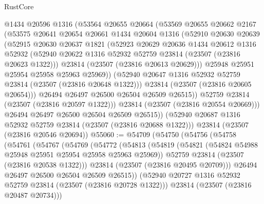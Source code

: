 \begin{lexlean}{RustCore}
\begin{coremodule}
            @1434
            @20596
            @1316
            (@53564
              @20655
              @20664
              (@53569
                @20655
                @20662
                @2167
                (@53575
                  @20641
                  @20654
                  @20661
                  @1434
                  @20604
                  @1316
                  (@52910
                    @20630
                    @20639
                    (@52915
                      @20630
                      @20637
                      @1821
                      (@52923
                        @20629
                        @20636
                        @1434
                        @20612
                        @1316
                        @52932
                        (@52940 @20622 @1316 @52932 @52759 @23814 (@23507 (@23816 @20623 @1322)))
                        @23814
                        (@23507 (@23816 @20613 @20629)))
                      @25948
                      @25951
                      @25954
                      @25958
                      @25963
                      @25969))
                  (@52940 @20647 @1316 @52932 @52759 @23814 (@23507 (@23816 @20648 @1322)))
                  @23814
                  (@23507 (@23816 @20605 @20654)))
                @26494
                @26497
                @26500
                @26504
                @26509
                @26515))
            @52759
            @23814
            (@23507 (@23816 @20597 @1322)))
          @23814
          (@23507 (@23816 @20554 @20669)))
        @26494
        @26497
        @26500
        @26504
        @26509
        @26515))
    (@52940 @20687 @1316 @52932 @52759 @23814 (@23507 (@23816 @20688 @1322)))
    @23814
    (@23507 (@23816 @20546 @20694))
@55060 := @54709
    (@54750
      (@54756
        (@54758
          (@54761
            (@54767
              (@54769
                (@54772
                  (@54813
                    (@54819
                      (@54821 (@54824 @54988 @25948 @25951 @25954 @25958 @25963 @25969))
                      @52759
                      @23814
                      (@23507 (@23816 @20538 @1322)))
                    @23814
                    (@23507 (@23816 @20495 @20709)))
                  @26494
                  @26497
                  @26500
                  @26504
                  @26509
                  @26515))
              (@52940 @20727 @1316 @52932 @52759 @23814 (@23507 (@23816 @20728 @1322)))
              @23814
              (@23507 (@23816 @20487 @20734)))

\end{coremodule}
\end{lexlean}
